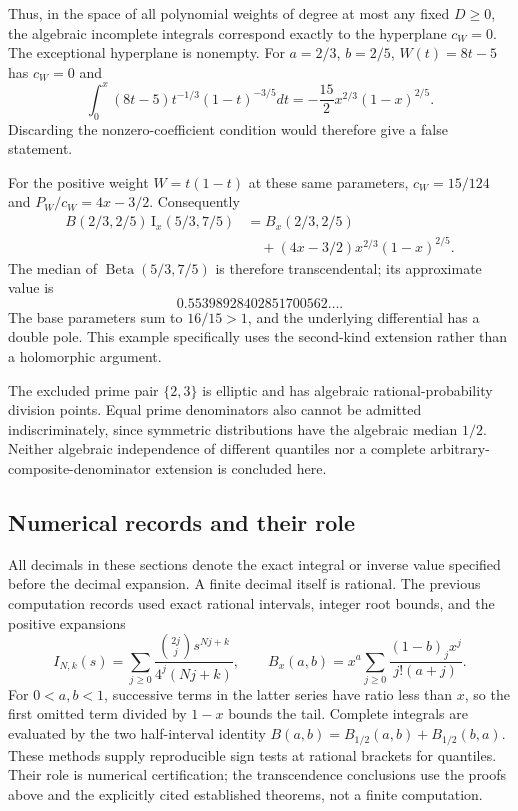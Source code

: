 \documentclass[11pt,a4paper]{article}
\theoremstyle{definition}
\theoremstyle{remark}
\numberwithin{equation}{section}
\begin{document}
Thus, in the space of all polynomial weights of degree at most any fixed
$D\ge0$, the algebraic incomplete integrals correspond exactly to the
hyperplane $c_W=0$.
The exceptional hyperplane is nonempty.  For $a=2/3$, $b=2/5$,
$W(t)=8t-5$ has $c_W=0$ and
\[
\int_0^x(8t-5)t^{-1/3}(1-t)^{-3/5}dt
=-\frac{15}{2}x^{2/3}(1-x)^{2/5}.
\]
Discarding the nonzero-coefficient condition would therefore give a
false statement.

For the positive weight $W=t(1-t)$ at these same parameters,
$c_W=15/124$ and $P_W/c_W=4x-3/2$.  Consequently
\begin{equation}\label{beta-eq-new-median}
\begin{aligned}
B(2/3,2/5)\,\mathrm I_x(5/3,7/5)
&=B_x(2/3,2/5)\\
&\quad +(4x-3/2)x^{2/3}(1-x)^{2/5}.
\end{aligned}
\end{equation}
The median of $\operatorname{Beta}(5/3,7/5)$ is therefore
transcendental; its approximate value is
\[
0.55398928402851700562\ldots.
\]
The base parameters sum to $16/15>1$, and the underlying differential
has a double pole.  This example specifically uses the second-kind
extension rather than a holomorphic argument.

The excluded prime pair $\{2,3\}$ is elliptic and has algebraic
rational-probability division points.  Equal prime denominators also
cannot be admitted indiscriminately, since symmetric distributions
have the algebraic median $1/2$.  Neither algebraic independence of
different quantiles nor a complete arbitrary-composite-denominator
extension is concluded here.

\subsection{Numerical records and their role}

All decimals in these sections denote the exact integral or inverse
value specified before the decimal expansion.  A finite decimal itself
is rational.  The previous computation records used exact rational
intervals, integer root bounds, and the positive expansions
\[
I_{N,k}(s)=\sum_{j\ge0}
\frac{\binom{2j}{j}s^{Nj+k}}{4^j(Nj+k)},\qquad
B_x(a,b)=x^a\sum_{j\ge0}\frac{(1-b)_jx^j}{j!(a+j)}.
\]
For $0<a,b<1$, successive terms in the latter series have ratio less
than $x$, so the first omitted term divided by $1-x$ bounds the tail.
Complete integrals are evaluated by the two half-interval identity
$B(a,b)=B_{1/2}(a,b)+B_{1/2}(b,a)$.  These methods supply reproducible
sign tests at rational brackets for quantiles.  Their role is numerical
certification; the transcendence conclusions use the proofs above and
the explicitly cited established theorems, not a finite computation.
\end{document}
